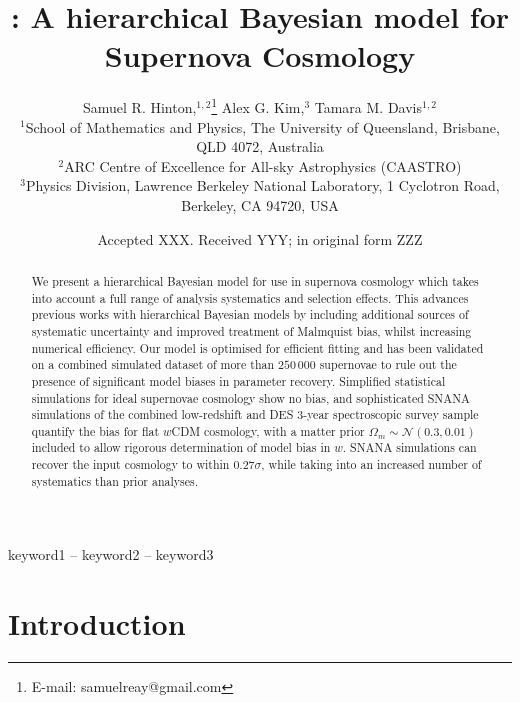 \documentclass[a4paper,fleqn,usenatbib]{mnras}
\title[\name]{\name: A hierarchical Bayesian model for Supernova Cosmology}
\author[S. R. Hinton et al.]{
	Samuel R. Hinton,$^{1,2}$\thanks{E-mail: samuelreay@gmail.com}
	Alex G. Kim,$^{3}$
	Tamara M. Davis$^{1,2}$
	\\
	$^{1}$School of Mathematics and Physics, The University of Queensland, Brisbane, QLD 4072, Australia\\
	$^{2}$ARC Centre of Excellence for All-sky Astrophysics (CAASTRO)\\
	$^{3}$Physics Division, Lawrence Berkeley National Laboratory, 1 Cyclotron Road, Berkeley, CA 94720, USA
}
\date{Accepted XXX. Received YYY; in original form ZZZ}
\begin{document}
\label{firstpage}
\pagerange{\pageref{firstpage}--\pageref{lastpage}}
\maketitle






\begin{abstract}
We present a hierarchical Bayesian model for use in supernova cosmology which takes into account a full range of analysis systematics and selection effects. This advances previous works with hierarchical Bayesian models by including additional sources of systematic uncertainty and improved treatment of Malmquist bias, whilst increasing numerical efficiency. Our model is optimised for efficient fitting and has been validated on a combined simulated dataset of more than $250\,000$ supernovae to rule out the presence of significant model biases in parameter recovery. Simplified statistical simulations for ideal supernovae cosmology show no bias, and sophisticated SNANA simulations of the combined low-redshift and DES 3-year spectroscopic survey sample quantify the bias for flat $w$CDM cosmology, with a matter prior $\Omega_m \sim \mathcal{N}(0.3, 0.01)$ included to allow rigorous determination of model bias in $w$. SNANA simulations can recover the input cosmology to within $0.27\sigma$, while taking into an increased number of systematics than prior analyses.
\end{abstract}

\begin{keywords}
keyword1 -- keyword2 -- keyword3\vspace{-5mm}
\end{keywords}










\section{Introduction}
\end{document}
